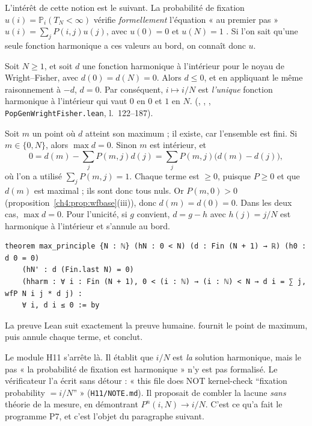 L'intérêt de cette notion est le suivant. La probabilité de fixation $u(i)=\mathbb P_i(T_N<\infty)$ vérifie
\emph{formellement} l'équation « au premier pas » $u(i)=\sum_jP(i,j)u(j)$, avec $u(0)=0$ et $u(N)=1$ \tierC.
Si l'on sait qu'une seule fonction harmonique a ces valeurs au bord, on connaît donc $u$.

\begin{theorem}\label{ch4:thm:maxprinc}
Soit $N\ge1$, et soit $d$ une fonction harmonique à l'intérieur pour le noyau de Wright--Fisher, avec $d(0)=d(N)=0$.
Alors $d\le0$, et en appliquant le même raisonnement à $-d$, $d=0$. Par conséquent, $i\mapsto i/N$ est
\emph{l'unique} fonction harmonique à l'intérieur qui vaut $0$ en $0$ et $1$ en $N$. \tierA{} (,
, , \texttt{PopGenWrightFisher.lean}, l.~122--187).
\end{theorem}

\begin{humanproof}
Soit $m$ un point où $d$ atteint son maximum ; il existe, car l'ensemble est fini. Si $m\in\{0,N\}$, alors
$\max d=0$. Sinon $m$ est intérieur, et
\[
0=d(m)-\sum_jP(m,j)d(j)=\sum_jP(m,j)\bigl(d(m)-d(j)\bigr),
\]
où l'on a utilisé $\sum_jP(m,j)=1$. Chaque terme est $\ge0$, puisque $P\ge0$ et que $d(m)$ est maximal ; ils
sont donc tous nuls. Or $P(m,0)>0$ (proposition~\ref{ch4:prop:wfbase}(iii)), donc $d(m)=d(0)=0$. Dans les deux
cas, $\max d=0$. Pour l'unicité, si $g$ convient, $d=g-h$ avec $h(j)=j/N$ est harmonique à l'intérieur et
s'annule au bord.
\end{humanproof}

\begin{leanbox}
\begin{lstlisting}[language=Lean]
theorem max_principle {N : ℕ} (hN : 0 < N) (d : Fin (N + 1) → ℝ) (h0 : d 0 = 0)
    (hN' : d (Fin.last N) = 0)
    (hharm : ∀ i : Fin (N + 1), 0 < (i : ℕ) → (i : ℕ) < N → d i = ∑ j, wfP N i j * d j) :
    ∀ i, d i ≤ 0 := by
\end{lstlisting}
La preuve Lean suit exactement la preuve humaine.  fournit le point de maximum, puis
 annule chaque terme, et  conclut.
\end{leanbox}

\begin{warnbox}
Le module H11 \cite{ch4:H1112} s'arrête là. Il établit que $i/N$ est \emph{la} solution harmonique, mais le pas « la probabilité
de fixation est harmonique » n'y est pas formalisé. Le vérificateur l'a écrit sans détour : « this file does NOT
kernel-check ``fixation probability $= i/N$'' » (\texttt{H11/NOTE.md}). Il proposait de combler la lacune
\emph{sans} théorie de la mesure, en démontrant $P^n(i,N)\to i/N$. C'est ce qu'a fait le programme P7, et c'est
l'objet du paragraphe suivant.
\end{warnbox}

